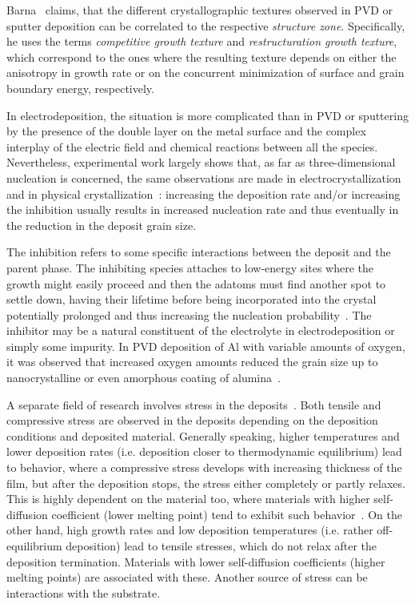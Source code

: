 Barna~\cite{Barna1998} claims, that the different crystallographic textures observed in PVD or sputter deposition can be correlated to the respective \textit{structure zone}. Specifically, he uses the terms \textit{competitive growth texture} and \textit{restructuration growth texture}, which correspond to the ones where the resulting texture depends on either the anisotropy in growth rate or on the concurrent minimization of surface and grain boundary energy, respectively.

In electrodeposition, the situation is more complicated than in PVD or sputtering by the presence of the double layer on the metal surface and the complex interplay of the electric field and chemical reactions between all the species.  Nevertheless, experimental work largely shows that, as far as three-dimensional nucleation is concerned, the same observations are made in electrocrystallization
and in physical crystallization~\cite{Winand1992}: increasing the deposition rate and/or increasing the inhibition usually results in increased nucleation rate and thus eventually in the reduction in the deposit grain size.

The inhibition refers to some specific interactions between the deposit and the parent phase. The inhibiting species attaches to low-energy sites where the growth might easily proceed and then the adatoms must find another spot to settle down, having their lifetime before being incorporated into the crystal potentially prolonged and thus increasing the nucleation probability~\cite{Winand1992}. The inhibitor may be a natural constituent of the electrolyte in electrodeposition or simply some impurity. In PVD deposition of Al with variable amounts of oxygen, it was observed that increased oxygen amounts reduced the grain size up to nanocrystalline or even amorphous coating of alumina~\cite{Barna1998}.

A separate field of research involves stress in the deposits~\cite{Thornton1989, Thompson1993, Chason2015, Abadias2018}. Both tensile and compressive stress are observed in the deposits depending on the deposition conditions and deposited material. Generally speaking, higher temperatures and lower deposition rates (i.e. deposition closer to thermodynamic equilibrium) lead to behavior, where a compressive stress develops with increasing thickness of the film, but after the deposition stops, the stress either completely or partly relaxes. This is highly dependent on the material too, where materials with higher self-diffusion coefficient (lower melting point) tend to exhibit such behavior~\cite{Chason2002}. On the other hand, high growth rates and low deposition temperatures (i.e. rather off-equilibrium deposition) lead to tensile stresses, which do not relax after the deposition termination. Materials with lower self-diffusion coefficients (higher melting points) are associated with these. Another source of stress can be interactions with the substrate.

